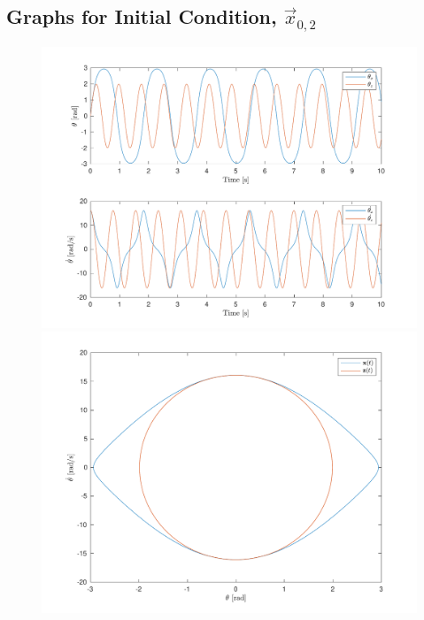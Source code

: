 \documentclass[10pt]{article}
\begin{document}
\subsection{Graphs for Initial Condition, \texorpdfstring{$\vec{x}_{0,2}$}{x02}}
\begin{figure}[ht]
    \centering
    \begin{minipage}[b]{0.45\textwidth}
        \centering
        \includegraphics[width=1\linewidth]{lab1/figs/section5_X0_2_state_evolution.pdf}
    \end{minipage}
    \begin{minipage}[b]{0.45\textwidth}
        \centering
        \includegraphics[width=1\linewidth]{lab1/figs/section5_X0_2_state_orbit.pdf}
    \end{minipage}
    
    \label{figure:X_0_2_state_evolution}
\end{figure}
\end{document}
